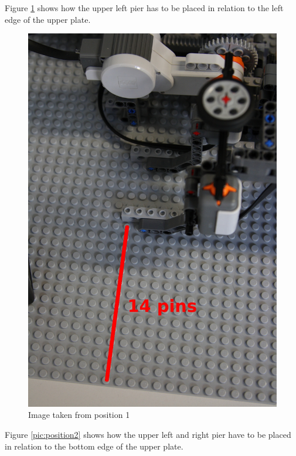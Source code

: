 \documentclass[%
  a4paper,%
  11pt,%
  blue,%
  hyperref	%
  ]{tubsartcl}
\begin{document}
\newpage

Figure \ref{pic:position1} shows how the upper left pier has to be placed in relation to the left edge of the upper plate.

\begin{figure}[!htb]
\begin{center}
\includegraphics[scale=0.35]{graphics_lego/position1.jpg}
\end{center}
\caption{Image taken from position 1}
\label{pic:position1}
\end{figure}

\newpage

Figure \ref{pic:position2} shows how the upper left and right pier have to be placed in relation to the bottom edge of the upper plate.
\end{document}
